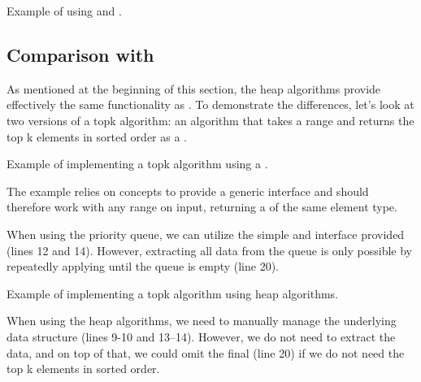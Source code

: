 \begin{codebox}[breakable]{\href{https://compiler-explorer.com/z/oz41sxfWb}{\ExternalLink}}
\footnotesize Example of using  and .
\tcblower
{}
\end{codebox}

\subsection{Comparison with \texorpdfstring{}{\texttt{std::priority\_queue}}}

As mentioned at the beginning of this section, the heap algorithms provide effectively the same functionality as . To demonstrate the differences, let's look at two versions of a topk algorithm: an algorithm that takes a range and returns the top k elements in sorted order as a .

\begin{codebox}[]{\href{https://compiler-explorer.com/z/TvPv3sWsj}{\ExternalLink}}
\footnotesize Example of implementing a topk algorithm using a .
\tcblower
{}
\end{codebox}

The example relies on  concepts to provide a generic interface and should therefore work with any range on input, returning a  of the same element type.

When using the priority queue, we can utilize the simple  and  interface provided (lines 12 and 14). However, extracting all data from the queue is only possible by repeatedly applying  until the queue is empty (line 20).

\begin{codebox}[]{\href{https://compiler-explorer.com/z/EYhGcr8qj}{\ExternalLink}}
\footnotesize Example of implementing a topk algorithm using heap algorithms.
\tcblower
{}
\end{codebox}

When using the heap algorithms, we need to manually manage the underlying data structure (lines 9-10 and 13–14). However, we do not need to extract the data, and on top of that, we could omit the final  (line 20) if we do not need the top k elements in sorted order.